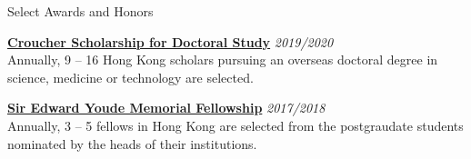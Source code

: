 \documentclass{resume} %
\begin{document}
\begin{rSection}{Select Awards and Honors}

\href{https://scholars.croucher.org.hk/scholars/siu-chun-yin}{\textbf{Croucher Scholarship for Doctoral Study}} \hfill {\em 2019/2020}\\
Annually, 9 -- 16 Hong Kong scholars pursuing an overseas doctoral degree in science, medicine or technology are selected.

\href{https://www.wfsfaa.gov.hk/sfo/seymf/en/index.htm}{\textbf{Sir Edward Youde Memorial Fellowship}} \hfill {\em 2017/2018}\\
Annually, 3 -- 5 fellows in Hong Kong are selected from the postgraudate students nominated by the heads of their institutions.


\end{rSection}

\newpage
\end{document}

